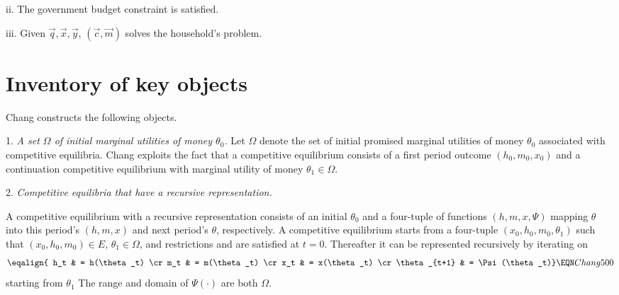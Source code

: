 \item{ii.} The government budget constraint  is satisfied.

\item{iii.} Given $\vec q, \vec x, \vec y$, $(\vec c, \vec m)$ solves the  household's problem.




\section{Inventory of key objects}

Chang constructs the following objects.




\medskip
\item{1.}  {\it A set $\Omega$ of initial marginal utilities  of money $\theta_0$.}
\medskip
\noindent Let $\Omega$ denote the set of initial promised marginal utilities of money  $\theta_0$ associated with competitive equilibria.
Chang exploits the fact  that a competitive equilibrium consists of a first period outcome $(h_0, m_0, x_0)$ and a continuation competitive equilibrium with marginal utility of money $\theta _1 \in \Omega$.


\vfil\break

\medskip
\item{2.}  {\it Competitive equilibria that have a recursive representation.}
\medskip


\noindent A competitive equilibrium with a recursive representation consists of an initial $\theta_0$ and a four-tuple of functions
$(h, m, x, \Psi)$ mapping $\theta$ into  this period's $(h, m, x)$   and next period's $\theta$, respectively.  A competitive equilibrium starts from a four-tuple $(x_0, h_0, m_0, \theta_1)$ such that $(x_0, h_0, m_0) \in E$,
 $\theta_1 \in \Omega$, and  restrictions  and     are satisfied at $t=0$.  Thereafter it can be represented recursively
by iterating on
$$ \eqalign{ h_t & = h(\theta_t) \cr
             m_t & = m(\theta_t) \cr
             x_t & = x(\theta_t) \cr
             \theta_{t+1} & = \Psi(\theta_t)}\EQN Chang500 $$
starting from $\theta_1$ The range and domain of $\Psi(\cdot)$ are both $\Omega$.


